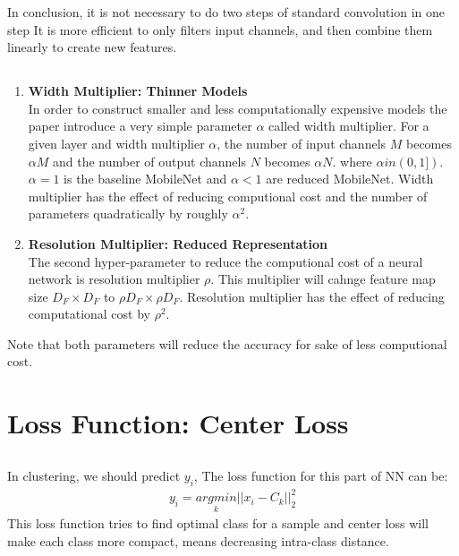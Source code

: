 \documentclass{article}
\begin{document}
In conclusion, it is not necessary to do two steps of standard convolution in one step
It is more efficient to only filters input channels, and then combine them
linearly to create new features.


\subsection{}
\begin{enumerate}
    \item \textbf{Width Multiplier: Thinner Models} \\
    In order to construct smaller and less computationally expensive models the 
    paper introduce a very simple parameter $\alpha$ called width multiplier. 
    For a given layer and width multiplier $\alpha$, the number of input channels 
    $M$ becomes $\alpha M$ and the number of output channels $N$ becomes $\alpha N$.
    where $\alpha in (0, 1])$. $\alpha = 1$ is the baseline MobileNet and $\alpha < 1$
    are reduced MobileNet. Width multiplier has the effect of reducing computional 
    cost and the number of parameters quadratically by roughly $\alpha^2$.

    \item \textbf{Resolution Multiplier: Reduced Representation} \\
    The second hyper-parameter to reduce the computional cost of a neural network is 
    resolution multiplier $\rho$. This multiplier will cahnge feature map size 
    $D_F \times D_F$ to $\rho D_F \times \rho D_F$. Resolution multiplier has the effect
    of reducing computational cost by $\rho^2$.
\end{enumerate}

Note that both parameters will reduce the accuracy for sake of less computional cost.



\section{Loss Function: Center Loss}

\subsection{}
In clustering, we should predict $y_i$, The loss function for this part of NN can be:
\begin{align*}
    y_i = \underset{k}{argmin} ||x_i - C_k||_2^2
\end{align*}
This loss function tries to find optimal class for a sample and center loss will make each class
more compact, means decreasing intra-class distance.
\end{document}
